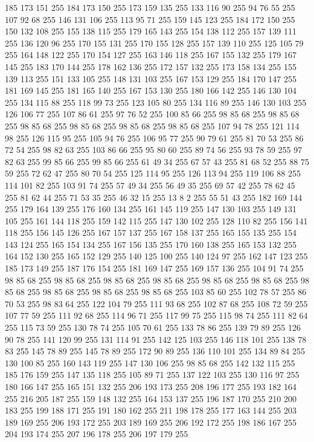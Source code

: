 185 173 151 255 184 173 150 255 173 159 135 255 133 116 90 255 94 76 55 255 107 92 68 255 146 131 106 255 113 95 71 255 159 145 123 255 184 172 150 255 150 132 108 255 155 138 115 255 179 165 143 255 154 138 112 255 157 139 111 255 136 120 96 255 170 155 131 255 170 155 128 255 157 139 110 255 125 105 79 255 164 148 122 255 170 154 127 255 163 146 118 255 167 155 132 255 179 167 145 255 183 170 144 255 178 162 136 255 172 157 132 255 173 158 134 255 155 139 113 255 151 133 105 255 148 131 103 255 167 153 129 255 184 170 147 255 181 169 145 255 181 165 140 255 167 153 130 255 180 166 142 255 146 130 104 255 134 115 88 255 118 99 73 255 123 105 80 255 134 116 89 255 146 130 103 255 126 106 77 255 107 86 61 255 97 76 52 255 100 85 66 255 98 85 68 255 98 85 68 255 98 85 68 255 98 85 68 255 98 85 68 255 98 85 68 255 107 94 78 255 121 114 98 255 126 115 95 255 105 94 76 255 106 95 77 255 90 79 61 255 81 70 53 255 86 72 54 255 98 82 63 255 103 86 66 255
95 80 60 255 89 74 56 255 93 78 59 255 97 82 63 255 99 85 66 255 99 85 66 255 61 49 34 255 67 57 43 255 81 68 52 255 88 75 59 255 72 62 47 255 80 70 54 255 125 114 95 255 126 113 94 255 119 106 88 255 114 101 82 255 103 91 74 255 57 49 34 255 56 49 35 255 69 57 42 255 78 62 45 255 81 62 44 255 71 53 35 255 46 32 15 255 13 8 2 255 55 51 43 255 182 169 144 255 179 164 139 255 176 160 134 255 161 145 119 255 147 130 103 255 149 131 105 255 161 144 118 255 159 142 115 255 147 130 102 255 128 110 82 255 156 141 118 255 156 145 126 255 167 157 137 255 167 158 137 255 165 155 135 255 154 143 124 255 165 154 134 255 167 156 135 255 170 160 138 255 165 153 132 255 164 152 130 255 165 152 129 255 140 125 100 255 140 124 97 255 162 147 123 255 185 173 149 255 187 176 154 255 181 169 147 255 169 157 136 255 104 91 74 255 98 85 68 255 98 85 68 255 98 85 68 255 98 85 68 255 98 85 68 255 98 85 68 255 98 85 68 255 98 85 68 255
98 85 68 255 98 85 68 255 103 85 60 255 102 78 57 255 86 70 53 255 98 83 64 255 122 104 79 255 111 93 68 255 102 87 68 255 108 72 59 255 107 77 59 255 111 92 68 255 114 96 71 255 117 99 75 255 115 98 74 255 111 82 64 255 115 73 59 255 130 78 74 255 105 70 61 255 133 78 86 255 139 79 89 255 126 90 78 255 141 120 99 255 131 114 91 255 142 125 103 255 146 118 101 255 138 78 83 255 145 78 89 255 145 78 89 255 172 90 89 255 136 110 101 255 134 89 84 255 130 100 85 255 160 143 119 255 147 130 106 255 98 85 68 255 142 132 115 255 185 176 159 255 147 135 118 255 105 89 71 255 137 122 103 255 130 116 97 255 180 166 147 255 165 151 132 255 206 193 173 255 208 196 177 255 193 182 164 255 216 205 187 255 159 148 132 255 164 153 137 255 196 187 170 255 210 200 183 255 199 188 171 255 191 180 162 255 211 198 178 255 177 163 144 255 203 189 169 255 206 193 172 255 203 189 169 255 206 192 172 255 198 186 167 255 204 193 174 255 207 196 178 255 206 197 179 255
